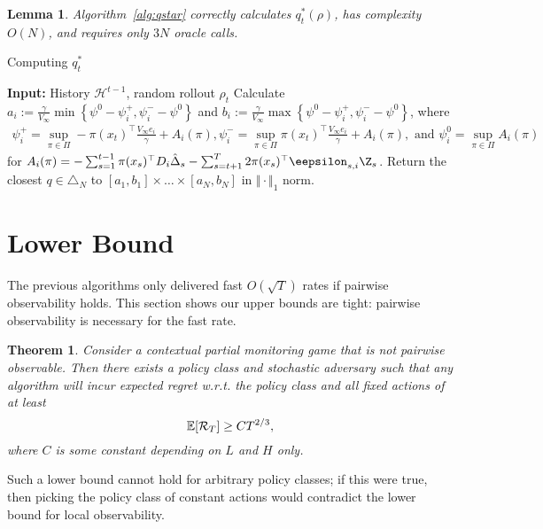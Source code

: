 \documentclass{article}
\newcommand{\regret}{\mathcal{R}}
\newcommand{\hist}{{\mathcal H}}
\newtheorem{lemma}{Lemma}
\newtheorem{theorem}{Theorem}
\begin{document}
\begin{lemma}\label{lem:computation}
  Algorithm~\ref{alg:qstar} correctly calculates $q_t^*(\rho)$, has complexity $O(N)$, and requires only $3N$ oracle calls.
\end{lemma}

\begin{algorithm}[tb]
   \caption{Computing $q_t^*$}
   \label{alg:qstar}
   \begin{algorithmic}
     \STATE\textbf{Input: } History $\hist^{t-1}$, random rollout $\rho_t$
     \STATE Calculate
     $ a_i := \frac{\gamma}{V_\infty} \min \left\{ \psi^0 - \psi_i^+, \psi_i^--\psi^0 \right\}$ and $b_i := \frac{\gamma}{V_\infty} \max \left\{ \psi^0 - \psi_i^+, \psi_i^--\psi^0 \right\}$, where     
     \begin{align*}
       \psi_i^+= \sup_{\pi\in\Pi}-\pi(x_t)^\top \frac{V_\infty e_i}{\gamma}
       +A_i(\pi),
       \psi_i^-= \sup_{\pi\in\Pi}\pi(x_t)^\top \frac{V_\infty e_i}{\gamma}
       +A_i(\pi), \text{ and }
       \psi_i^0= \sup_{\pi\in\Pi} A_i(\pi)
     \end{align*}
     for $A_i(\pi) = -\sum_{s=1}^{t-1} \pi(x_s)^\top D_i \hat \Delta_s - \sum_{s=t+1}^T 2\pi(x_s)^\top  \eepsilon_{s,i} \Z_{s}$.     
     \STATE Return the closest $q\in\triangle_N$ to $[a_1,b_1]\times\ldots\times[a_N,b_N]$ in $\Vert\cdot\Vert_1$ norm.
   \end{algorithmic}
\end{algorithm}

\section{Lower Bound}
\label{sec:lower.bound}
The previous algorithms only delivered fast $O(\sqrt{T})$ rates if pairwise observability holds. This section shows our upper bounds are tight: pairwise observability is necessary for the fast rate.
\begin{theorem} \label{thm:lower.bound}
  Consider a contextual partial monitoring game that is not pairwise observable. Then there exists a policy class and stochastic adversary such that any algorithm will incur expected regret w.r.t. the policy class and all fixed actions of at least
  \[
    \ex[ \regret_T] \geq C T^{2/3},
  \]
  where $C$ is some constant depending on $L$ and $H$ only.  
\end{theorem}
Such a lower bound cannot hold for arbitrary policy classes; if this were true, then picking the policy class of constant actions would contradict the lower bound for local observability.
\end{document}
